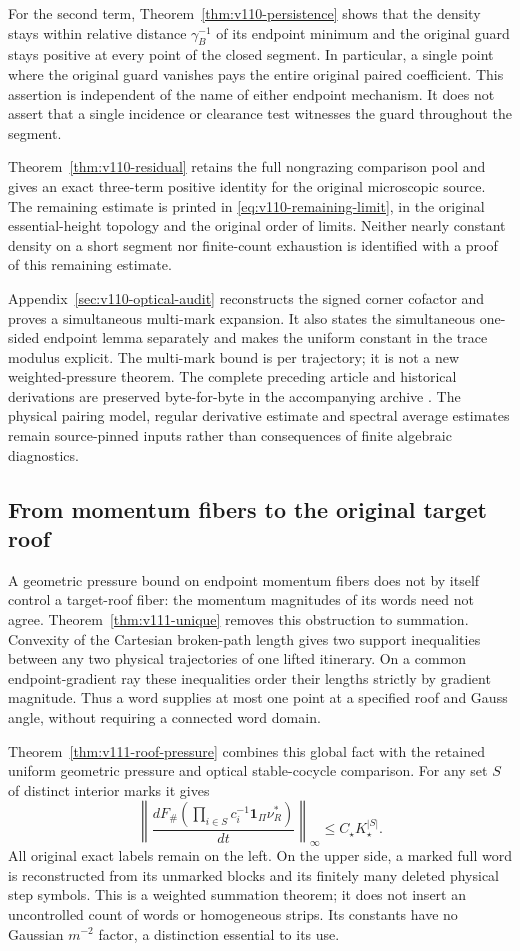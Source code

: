 \documentclass[11pt,reqno]{amsart}
\numberwithin{equation}{section}
\theoremstyle{definition}\newtheorem{definition}[theorem]{Definition}
\theoremstyle{remark}\newtheorem{remark}[theorem]{Remark}
\newcommand{\one}{\mathbf1}\newcommand{\dd}{\,\mathrm d}
\begin{document}
For the second term, Theorem~\ref{thm:v110-persistence} shows that the
density stays within relative distance $\gamma_B^{-1}$ of its
endpoint minimum and the original guard stays positive at every
point of the closed segment. In particular, a single point where
the original guard vanishes pays the entire original paired
coefficient. This assertion is independent of the name of either
endpoint mechanism. It does not assert that a single incidence or
clearance test witnesses the guard throughout the segment.

Theorem~\ref{thm:v110-residual} retains the full nongrazing comparison
pool and gives an exact three-term positive identity for the
original microscopic source. The remaining estimate is printed in
\eqref{eq:v110-remaining-limit}, in the original essential-height
topology and the original order of limits. Neither nearly constant
density on a short segment nor finite-count exhaustion is identified
with a proof of this remaining estimate.

Appendix~\ref{sec:v110-optical-audit} reconstructs the signed corner
cofactor and proves a simultaneous multi-mark expansion. It also
states the simultaneous one-sided endpoint lemma separately and
makes the uniform constant in the trace modulus explicit. The
multi-mark bound is per trajectory; it is not a new weighted-pressure
theorem. The complete preceding article and historical derivations
are preserved byte-for-byte in the accompanying archive \cite{Q110}.
The physical pairing model, regular derivative estimate and spectral
average estimates remain source-pinned inputs rather than consequences
of finite algebraic diagnostics.

\subsection*{From momentum fibers to the original target roof}
A geometric pressure bound on endpoint momentum fibers does not by
itself control a target-roof fiber: the momentum magnitudes of its
words need not agree. Theorem~\ref{thm:v111-unique} removes this
obstruction to summation. Convexity of the Cartesian broken-path
length gives two support inequalities between any two physical
trajectories of one lifted itinerary. On a common endpoint-gradient
ray these inequalities order their lengths strictly by gradient
magnitude. Thus a word supplies at most one point at a specified
roof and Gauss angle, without requiring a connected word domain.

Theorem~\ref{thm:v111-roof-pressure} combines this global fact with
the retained uniform geometric pressure and optical stable-cocycle
comparison. For any set $S$ of distinct interior marks it gives
\[
 \left\|\frac{dF_\#(\prod_{i\in S}c_i^{-1}\one_\Pi\nu_R^*)}{dt}
             \right\|_\infty\le C_\star K_\star^{|S|}.
\]
All original exact labels remain on the left. On the upper side,
a marked full word is reconstructed from its unmarked blocks and
its finitely many deleted physical step symbols. This is a weighted
summation theorem; it does not insert an uncontrolled count of words
or homogeneous strips. Its constants have no Gaussian $m^{-2}$
factor, a distinction essential to its use.
\end{document}
